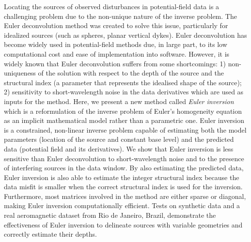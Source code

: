 Locating the sources of observed disturbances in potential-field data is a challenging problem due to the non-unique nature of the inverse problem.
The Euler deconvolution method was created to solve this issue, particularly for idealized sources (such as spheres, planar vertical dykes).
Euler deconvolution has become widely used in potential-field methods due, in large part, to its low computational cost and ease of implementation into software.
However, it is widely known that Euler deconvolution suffers from some shortcomings: 1) non-uniqueness of the solution with respect to the depth of the source and the structural index (a parameter that represents the idealised shape of the source); 2) sensitivity to short-wavelength noise in the data derivatives which are used as inputs for the method.
Here, we present a new method called \textit{Euler inversion} which is a reformulation of the inverse problem of Euler's homogeneity equation as an implicit mathematical model rather than a parametric one.
Euler inversion is a constrained, non-linear inverse problem capable of estimating both the model parameters (location of the source and constant base level) and the predicted data (potential field and its derivatives).
We show that Euler inversion is less sensitive than Euler deconvolution to short-wavelength noise and to the presence of interfering sources in the data window.
By also estimating the predicted data, Euler inversion is also able to estimate the integer structural index because the data misfit is smaller when the correct structural index is used for the inversion.
Furthermore, most matrices involved in the method are either sparse or diagonal, making Euler inversion computationally efficient.
Tests on synthetic data and a real aeromagnetic dataset from Rio de Janeiro, Brazil, demonstrate the effectiveness of Euler inversion to delineate sources with variable geometries and correctly estimate their depths.
